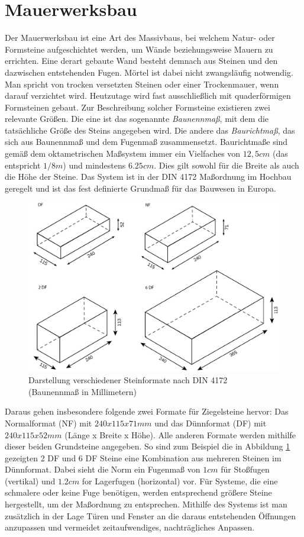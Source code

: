 \section{Mauerwerksbau}
\label{basics: Mauerwerksbau}
Der Mauerwerksbau ist eine Art des Massivbaus, bei welchem Natur- oder Formsteine aufgeschichtet werden, um Wände beziehungsweise Mauern zu errichten.
Eine derart gebaute Wand besteht demnach aus Steinen und den dazwischen entstehenden Fugen.
Mörtel ist dabei nicht zwangsläufig notwendig.
Man spricht von trocken versetzten Steinen oder einer Trockenmauer, wenn darauf verzichtet wird.
Heutzutage wird fast ausschließlich mit quaderförmigen Formsteinen gebaut.
Zur Beschreibung solcher Formsteine existieren zwei relevante Größen.
Die eine ist das sogenannte \textit{Baunennmaß}, mit dem die tatsächliche Größe des Steins angegeben wird.
Die andere das \textit{Baurichtmaß}, das sich aus Baunennmaß und dem Fugenmaß zusammensetzt.
Baurichtmaße sind gemäß dem oktametrischen Maßsystem immer ein Vielfaches von \(12,5 cm\) (das entspricht \(1/8 m\)) und mindestens \(6.25cm\).
Dies gilt sowohl für die Breite als auch die Höhe der Steine.
Das System ist in der DIN 4172 Maßordnung im Hochbau geregelt und ist das fest definierte Grundmaß für das Bauwesen in Europa\cite{DIN417224}.

\begin{figure}[ht]
    \centering
    \includegraphics[width=0.8\columnwidth]{fig/Ziegelsteinformate DF NF 2DF 6DF.png}
    \caption{Darstellung verschiedener Steinformate nach DIN 4172 (Baunennmaß in Millimetern) \cite{Steinfor38:online}}
    \label{fig:Steinformate}
\end{figure}

Daraus gehen insbesondere folgende zwei Formate für Ziegelsteine hervor:
Das Normalformat (NF) mit \(240 x 115 x 71 mm\) und das Dünnformat (DF) mit  \(240 x 115 x 52 mm\) (Länge x Breite x Höhe).
Alle anderen Formate werden mithilfe dieser beiden Grundsteine angegeben.
So sind zum Beispiel die in Abbildung \ref{fig:Steinformate} gezeigten 2 DF und 6 DF Steine eine Kombination aus mehreren Steinen im Dünnformat.
Dabei sieht die Norm ein Fugenmaß von \(1 cm\) für Stoßfugen (vertikal) und \(1.2 cm\) for Lagerfugen (horizontal) vor.
Für Systeme, die eine schmalere oder keine Fuge benötigen, werden entsprechend größere Steine hergestellt, um der Maßordnung zu entsprechen.
Mithilfe des Systems ist man zusätzlich in der Lage Türen und Fenster an die daraus entstehenden Öffnungen anzupassen und vermeidet zeitaufwendiges, nachträgliches Anpassen.

